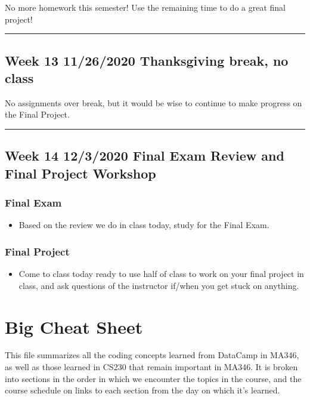 \documentclass[letterpaper,10pt,english]{sphinxmanual}
\begin{document}
No more homework this semester!  Use the remaining time to do a great final project!


\bigskip\hrule\bigskip



\section{Week 13 \sphinxhyphen{} 11/26/2020 \sphinxhyphen{} Thanksgiving break, no class}
\label{\detokenize{course-schedule:week-13-11-26-2020-thanksgiving-break-no-class}}
No assignments over break, but it would be wise to continue to make progress on the Final Project.


\bigskip\hrule\bigskip



\section{Week 14 \sphinxhyphen{} 12/3/2020 \sphinxhyphen{} Final Exam Review and Final Project Workshop}
\label{\detokenize{course-schedule:week-14-12-3-2020-final-exam-review-and-final-project-workshop}}

\subsection{Final Exam}
\label{\detokenize{course-schedule:final-exam}}\begin{itemize}
\item {} 
Based on the review we do in class today, study for the Final Exam.

\end{itemize}


\subsection{Final Project}
\label{\detokenize{course-schedule:final-project}}\begin{itemize}
\item {} 
Come to class today ready to use half of class to work on your final project in class, and ask questions of the instructor if/when you get stuck on anything.

\end{itemize}


\chapter{Big Cheat Sheet}
\label{\detokenize{big-cheat-sheet:big-cheat-sheet}}\label{\detokenize{big-cheat-sheet::doc}}
This file summarizes all the coding concepts learned from DataCamp in MA346, as well as those learned in CS230 that remain important in MA346.  It is broken into sections in the order in which we encounter the topics in the course, and the course schedule on {\hyperref[\detokenize{intro::doc}]{}} links to each section from the day on which it’s learned.
\end{document}
